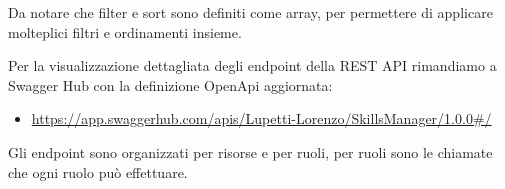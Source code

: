 

Da notare che filter e sort sono definiti come array, per permettere di applicare molteplici filtri e ordinamenti insieme. 

\vspace{0,3cm}

Per la visualizzazione dettagliata degli endpoint della REST API rimandiamo a Swagger Hub con la definizione OpenApi aggiornata:

\begin{itemize}
    \item \url{https://app.swaggerhub.com/apis/Lupetti-Lorenzo/SkillsManager/1.0.0#/}
\end{itemize}

Gli endpoint sono organizzati per risorse e per ruoli, per ruoli sono le chiamate che ogni ruolo può effettuare.

